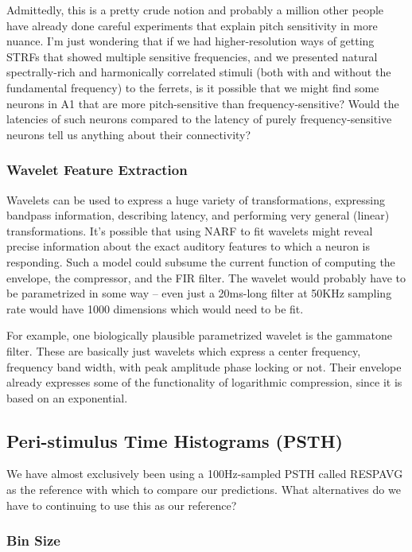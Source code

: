 \documentclass[11pt]{article}
\begin{document}
    Admittedly, this is a pretty crude notion and probably a million other people have already done careful experiments that explain pitch sensitivity in more nuance. I'm just wondering that if we had higher-resolution ways of getting STRFs that showed multiple sensitive frequencies, and we presented natural spectrally-rich and harmonically correlated stimuli (both with and without the fundamental frequency) to the ferrets, is it possible that we might find some neurons in A1 that are more pitch-sensitive than frequency-sensitive? Would the latencies of such neurons compared to the latency of purely frequency-sensitive neurons tell us anything about their connectivity?

\subsubsection{Wavelet Feature Extraction}
\label{sec-2.1.5}


    Wavelets can be used to express a huge variety of transformations, expressing bandpass information, describing latency, and performing very general (linear) transformations. It's possible that using NARF to fit wavelets might reveal precise information about the exact auditory features to which a neuron is responding. Such a model could subsume the current function of computing the envelope, the compressor, and the FIR filter. The wavelet would probably have to be parametrized in some way -- even just a 20ms-long filter at 50KHz sampling rate would have 1000 dimensions which would need to be fit.
    
    For example, one biologically plausible parametrized wavelet is the gammatone filter. These are basically just wavelets which express a center frequency, frequency band width, with peak amplitude phase locking or not. Their envelope already expresses some of the functionality of logarithmic compression, since it is based on an exponential.

\subsection{Peri-stimulus Time Histograms (PSTH)}
\label{sec-2.2}


   We have almost exclusively been using a 100Hz-sampled PSTH called RESPAVG as the reference with which to compare our predictions. What alternatives do we have to continuing to use this as our reference?

\subsubsection{Bin Size}
\label{sec-2.2.1}
\end{document}
